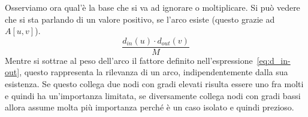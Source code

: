 Osserviamo ora qual'è la base che si va ad ignorare o moltiplicare. Si può vedere che si sta parlando di un valore positivo, se l'arco esiste (questo grazie ad $\displaystyle A \left[ u,v \right]$). 
\begin{equation}
	\frac{ d_{in}\left(u\right) \cdot d_{out}\left(v\right) }{M}
	\label{eq:d_in-out}
\end{equation}
Mentre si sottrae al peso dell'arco il fattore definito nell'espressione~\ref{eq:d_in-out}, questo rappresenta la rilevanza di un arco, indipendentemente dalla sua esistenza. Se questo collega due nodi con gradi elevati risulta essere uno fra molti e quindi ha un'importanza limitata, se diversamente collega nodi con gradi bassi allora assume molta più importanza perché è un caso isolato e quindi prezioso.
%
%
%

